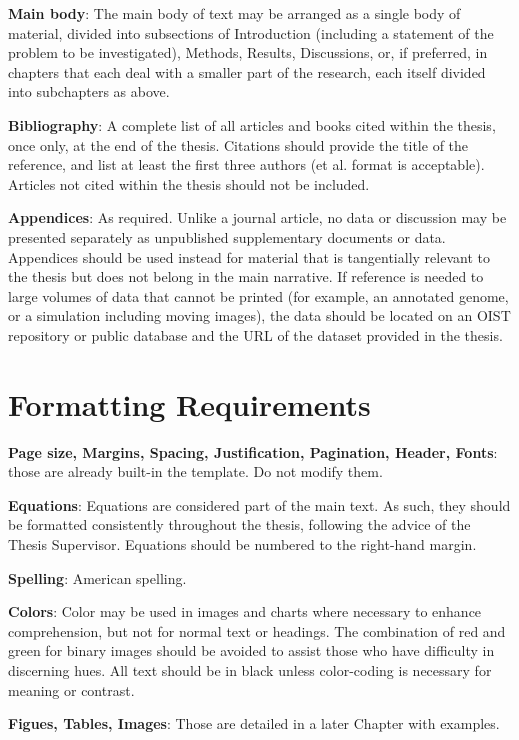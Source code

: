 \textbf{Main body}:  The main body of text may be arranged as a single body of material, divided into subsections of Introduction (including a statement of the problem to be investigated), Methods, Results, Discussions, or, if preferred, in chapters that each deal with a smaller part of the research, each itself divided into subchapters as above.

\textbf{Bibliography}: A complete list of all articles and books cited within the thesis, once only, at the end of the thesis.  Citations should provide the title of the reference, and list at least the first three authors (et al. format is acceptable).  Articles not cited within the thesis should not be included.

\textbf{Appendices}: As required.  Unlike a journal article, no data or discussion may be presented separately as unpublished supplementary documents or data.  Appendices should be used instead for material that is tangentially relevant to the thesis but does not belong in the main narrative.  If reference is needed to large volumes of data that cannot be printed (for example, an annotated genome, or a simulation including moving images), the data should be located on an OIST repository or public database and the URL of the dataset provided in the thesis.


\section{Formatting Requirements}

\textbf{Page size, Margins, Spacing, Justification, Pagination, Header, Fonts}: those are already built-in the template. Do not modify them.

\textbf{Equations}: Equations are considered part of the main text.  As such, they should be formatted consistently throughout the thesis, following the advice of the Thesis Supervisor.  Equations should be numbered to the right-hand margin.

\textbf{Spelling}: American spelling.


\textbf{Colors}: Color may be used in images and charts where necessary to enhance comprehension, but not for normal text or headings.  The combination of red and green for binary images should be avoided to assist those who have difficulty in discerning hues.  All text should be in black unless color-coding is necessary for meaning or contrast.

\textbf{Figues, Tables, Images}: Those are detailed in a later Chapter with examples.

